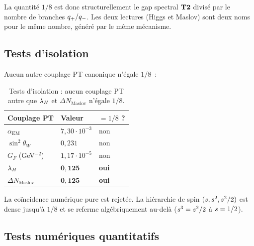 La quantité $1/8$ est donc structurellement le gap spectral $\textbf{T2}$
divisé par le nombre de branches $q_{+}/q_{-}$. Les deux lectures
(Higgs et Maslov) sont deux noms pour le même nombre, généré par le même
mécanisme.

\subsection{Tests d'isolation}
\label{sec:isolation}

Aucun autre couplage PT canonique n'égale $1/8$~:

\begin{table}[ht]
\centering
\begin{tabular}{@{}lll@{}}
\toprule
\textbf{Couplage PT} & \textbf{Valeur} & \textbf{$= 1/8$ ?}\\
\midrule
$\alpha_{\mathrm{EM}}$ & $7{,}30 \cdot 10^{-3}$ & non\\
$\sin^{2}\theta_W$ & $0{,}231$ & non\\
$G_F$ (GeV$^{-2}$) & $1{,}17 \cdot 10^{-5}$ & non\\
$\lambda_H$ & $\mathbf{0{,}125}$ & \textbf{oui}\\
$\Delta N_{\mathrm{Maslov}}$ & $\mathbf{0{,}125}$ & \textbf{oui}\\
\bottomrule
\end{tabular}
\caption{Tests d'isolation : aucun couplage PT autre que $\lambda_H$ et
$\Delta N_{\mathrm{Maslov}}$ n'égale $1/8$.}
\label{tab:isolation}
\end{table}

La coïncidence numérique pure est rejetée. La hiérarchie de spin
$(s, s^{2}, s^{2}/2)$ est dense jusqu'à $1/8$ et se referme
algébriquement au-delà ($s^{3} = s^{2}/2$ à $s = 1/2$).

\subsection{Tests numériques quantitatifs}
\label{sec:tests_higgs}

